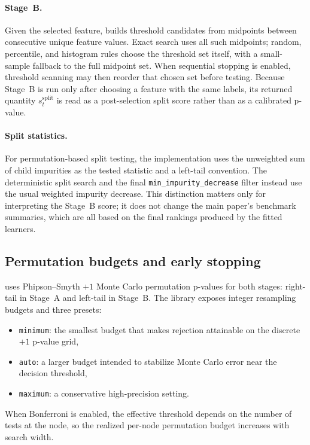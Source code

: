 \paragraph{Stage~B.}
Given the selected feature, \citrees builds threshold candidates from midpoints
between consecutive unique feature values. Exact search uses all such
midpoints; random, percentile, and histogram rules choose the threshold set
itself, with a small-sample fallback to the full midpoint set. When sequential
stopping is enabled, threshold scanning may then reorder that chosen set before
testing. Because Stage~B is run only after choosing a feature with the same
labels, its returned quantity $s_t^{\mathrm{split}}$ is read as a post-selection
split score rather than as a calibrated p-value.

\paragraph{Split statistics.}
For permutation-based split testing, the implementation uses the unweighted sum
of child impurities as the tested statistic and a left-tail convention. The
deterministic split search and the final
\texttt{min\_impurity\_decrease} filter instead use the usual weighted impurity
decrease. This distinction matters only for interpreting the Stage~B score; it
does not change the main paper's benchmark summaries, which are all based on the
final rankings produced by the fitted learners.

\subsection{Permutation budgets and early stopping}

\citrees uses Phipson--Smyth $+1$ Monte Carlo permutation p-values
\citep{PhipsonSmyth2010PermutationPValues} for both stages: right-tail in
Stage~A and left-tail in Stage~B. The library exposes integer resampling budgets
and three presets:
\begin{itemize}
  \item \texttt{minimum}: the smallest budget that makes rejection attainable on
  the discrete $+1$ p-value grid,
  \item \texttt{auto}: a larger budget intended to stabilize Monte Carlo error
  near the decision threshold,
  \item \texttt{maximum}: a conservative high-precision setting.
\end{itemize}
When Bonferroni is enabled, the effective threshold depends on the number of
tests at the node, so the realized per-node permutation budget increases with
search width.

